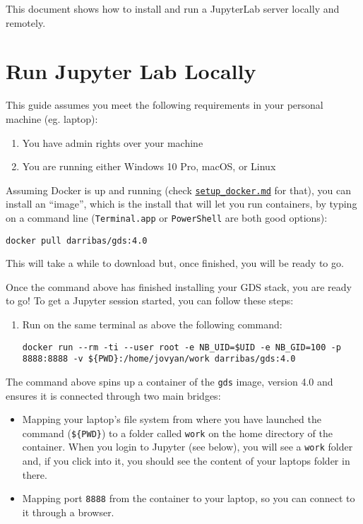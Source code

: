 \documentclass[
]{book}
\providecommand{\tightlist}{%
  \setlength{\itemsep}{0pt}\setlength{\parskip}{0pt}}
\begin{document}
This document shows how to install and run a JupyterLab server locally and
remotely.

\hypertarget{run-jupyter-lab-locally}{%
\section{Run Jupyter Lab Locally}\label{run-jupyter-lab-locally}}

This guide assumes you meet the following requirements in your personal
machine (eg. laptop):

\begin{enumerate}
\def\labelenumi{\arabic{enumi}.}
\tightlist
\item
  You have admin rights over your machine
\item
  You are running either Windows 10 Pro, macOS, or Linux
\end{enumerate}

Assuming Docker is up and running (check \href{setup_docker.md}{\texttt{setup\_docker.md}}
for that), you can install an ``image'', which is the install that will let you
run containers, by typing on a command line (\texttt{Terminal.app} or \texttt{PowerShell}
are both good options):

\begin{verbatim}
docker pull darribas/gds:4.0
\end{verbatim}

This will take a while to download but, once finished, you will be ready
to go.

Once the command above has finished installing your GDS stack, you are ready to go! To get a Jupyter session started, you can follow these steps:

\begin{enumerate}
\def\labelenumi{\arabic{enumi}.}
\item
  Run on the same terminal as above the following command:

\begin{verbatim}
docker run --rm -ti --user root -e NB_UID=$UID -e NB_GID=100 -p 8888:8888 -v ${PWD}:/home/jovyan/work darribas/gds:4.0
\end{verbatim}
\end{enumerate}

The command above spins up a container of the \texttt{gds} image, version 4.0 and
ensures it is connected through two main bridges:

\begin{itemize}
\tightlist
\item
  Mapping your laptop's file system from where you have launched the
  command (\texttt{\$\{PWD\}}) to a folder called \texttt{work} on the home directory of
  the container. When you login to Jupyter (see below), you will see a
  \texttt{work} folder and, if you click into it, you should see the content of
  your laptops folder in there.
\item
  Mapping port \texttt{8888} from the container to your laptop, so you can
  connect to it through a browser.
\end{itemize}
\end{document}
